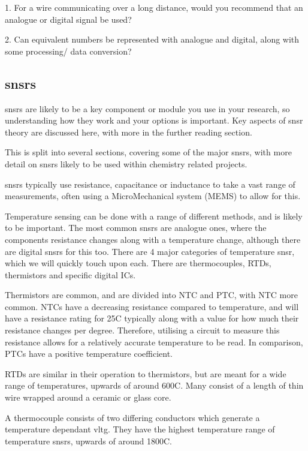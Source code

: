 \documentclass[a4paper,11pt]{report}
\newcommand{\Theory}[1] %
{
\phantomsection %
\todo[inline, color=green!30]{\textbf{#1}} %
\vspace{1em} %
}
\newcommand{\Quiz}[1] %
{
\par\noindent %
\phantomsection %
\todo[inline, color=blue!30]{\textbf{#1}} %
\vspace{1em} %
}
\begin{document}
\Quiz{Quiz}

1. For a wire communicating over a long distance, would you recommend that an analogue or digital signal be used?

2. Can equivalent numbers be represented with analogue and digital, along with some processing/ data conversion?

\subsection{\gls{snsr}s}

\Theory{What are \gls{snsr}s?}

\gls{snsr}s are likely to be a key component or module you use in your research, so understanding how they work and your options is important. Key aspects of \gls{snsr} theory are discussed here, with more in the further reading section.

This is split into several sections, covering some of the major \gls{snsr}s, with more detail on \gls{snsr}s likely to be used within chemistry related projects.

\gls{snsr}s typically use resistance, capacitance or inductance to take a vast range of measurements, often using a MicroMechanical system (MEMS) to allow for this.

Temperature sensing can be done with a range of different methods, and is likely to be important. The most common \gls{snsr}s are analogue ones, where the components resistance changes along with a temperature change, although there are digital \gls{snsr}s for this too. There are 4 major categories of temperature \gls{snsr}, which we will quickly touch upon each. There are thermocouples, RTDs, thermistors and specific digital ICs.

Thermistors are common, and are divided into NTC and PTC, with NTC more common. NTCs have a decreasing resistance compared to temperature, and will have a resistance rating for 25\degree C typically along with a value for how much their resistance changes per degree. Therefore, utilising a circuit to measure this resistance allows for a relatively accurate temperature to be read. In comparison, PTCs have a positive temperature coefficient.

RTDs are similar in their operation to thermistors, but are meant for a wide range of temperatures, upwards of around 600C. Many consist of a length of thin wire wrapped around a ceramic or glass core.

A thermocouple consists of two differing conductors which generate a temperature dependant \gls{vltg}. They have the highest temperature range of temperature \gls{snsr}s, upwards of around 1800C.
\end{document}
